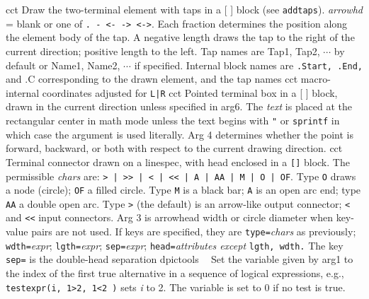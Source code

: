 %
  {cct}%
  {Draw the two-terminal element with taps in a [ ] block (see
  {\tt addtaps}).
   {\sl arrowhd} = blank or one of {\tt . - <- -> <->}.  Each fraction
   determines the position along the element body of the tap.  A negative
   length draws the tap to the right of the current direction; positive
   length to the left.  Tap names are Tap1, Tap2, $\cdots$ by default
   or Name1, Name2, $\cdots$ if specified.  Internal block names are
   {\tt .Start, .End,} and {.C} corresponding to the drawn element,
   and the tap names  }%
%
  {cct}%
  {macro-internal coordinates adjusted for {\tt L|R}}%
%
  {cct}%
  {Pointed terminal box in a [ ] block, drawn in the current
   direction unless specified in arg6. The {\sl text} is placed at the
   rectangular center in math mode unless the text begins with {\tt "}
   or {\tt sprintf} in which case the argument is used literally.
   Arg 4 determines whether the point is forward, backward, or both with
   respect to the current drawing direction.
   }%
%
  {cct}%
  {Terminal connector drawn on a linespec, with head enclosed in a {\tt []}%
   block.  The permissible {\sl chars} are:
   {\tt > | >{}> | < | <{}< | A | AA | M | O | OF}.
   Type {\tt O} draws a node (circle); {\tt OF} a filled circle.
   Type {\tt M} is a black bar; {\tt A} is an open arc end; type {\tt AA}
   a double open arc.  Type {\tt >} (the default) is an arrow-like output
   connector; {\tt <} and {\tt <<} input connectors.  Arg 3 is arrowhead
   width or circle diameter when key-value pairs are not used.
   If keys are specified, they are {\tt type=}{\sl chars} as previously;
   {\tt wdth=}{\sl expr}; {\tt lgth=}{\sl expr}; {\tt sep=}{\sl expr};
   {\tt head=}{\sl attributes except} {\tt lgth, wdth.}
   The key {\tt sep=} is the double-head separation
    }%
%
  {dpictools}%
  {$\;\;$ Set the variable given by arg1 to the index of the first true
  alternative in a sequence of logical expressions, e.g.,
  {\tt testexpr(i, 1>2, 1<2 )} sets {\sl i} to 2. The variable is set to 0
   if no test is true.}%
%
